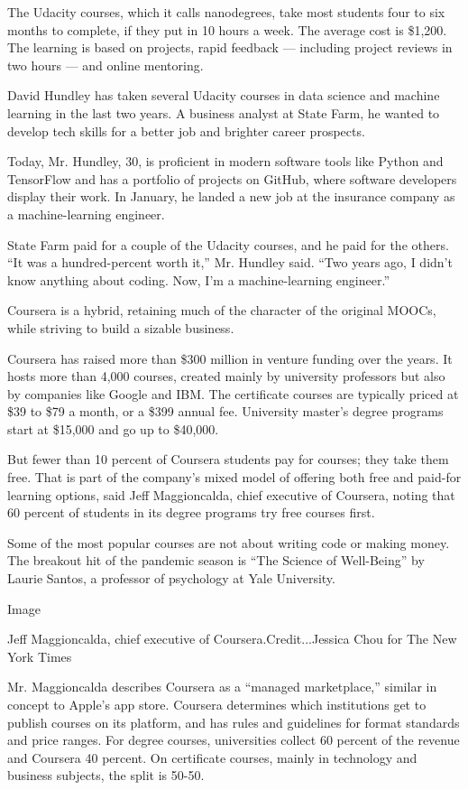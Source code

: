 The Udacity courses, which it calls nanodegrees, take most students four
to six months to complete, if they put in 10 hours a week. The average
cost is \$1,200. The learning is based on projects, rapid feedback ---
including project reviews in two hours --- and online mentoring.

David Hundley has taken several Udacity courses in data science and
machine learning in the last two years. A business analyst at State
Farm, he wanted to develop tech skills for a better job and brighter
career prospects.

Today, Mr. Hundley, 30, is proficient in modern software tools like
Python and TensorFlow and has a portfolio of projects on GitHub, where
software developers display their work. In January, he landed a new job
at the insurance company as a machine-learning engineer.

State Farm paid for a couple of the Udacity courses, and he paid for the
others. ``It was a hundred-percent worth it,'' Mr. Hundley said. ``Two
years ago, I didn't know anything about coding. Now, I'm a
machine-learning engineer.''

Coursera is a hybrid, retaining much of the character of the original
MOOCs, while striving to build a sizable business.

Coursera has raised more than \$300 million in venture funding over the
years. It hosts more than 4,000 courses, created mainly by university
professors but also by companies like Google and IBM. The certificate
courses are typically priced at \$39 to \$79 a month, or a \$399 annual
fee. University master's degree programs start at \$15,000 and go up to
\$40,000.

But fewer than 10 percent of Coursera students pay for courses; they
take them free. That is part of the company's mixed model of offering
both free and paid-for learning options, said Jeff Maggioncalda, chief
executive of Coursera, noting that 60 percent of students in its degree
programs try free courses first.

Some of the most popular courses are not about writing code or making
money. The breakout hit of the pandemic season is ``The Science of
Well-Being'' by Laurie Santos, a professor of psychology at Yale
University.

Image

Jeff Maggioncalda, chief executive of Coursera.Credit...Jessica Chou for
The New York Times

Mr. Maggioncalda describes Coursera as a ``managed marketplace,''
similar in concept to Apple's app store. Coursera determines which
institutions get to publish courses on its platform, and has rules and
guidelines for format standards and price ranges. For degree courses,
universities collect 60 percent of the revenue and Coursera 40 percent.
On certificate courses, mainly in technology and business subjects, the
split is 50-50.

